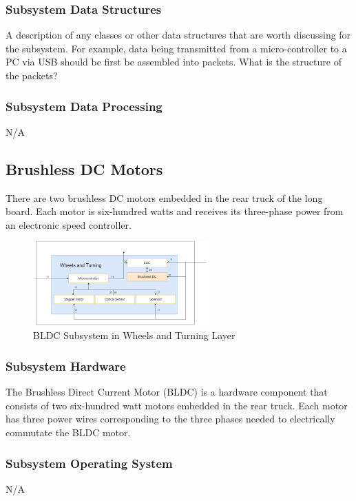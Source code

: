 \subsubsection{Subsystem Data Structures}
A description of any classes or other data structures that are worth discussing for the subsystem. For example, data being transmitted from a micro-controller to a PC via USB should be first be assembled into packets. What is the structure of the packets?

\subsubsection{Subsystem Data Processing}
N/A

\subsection{Brushless DC Motors}
There are two brushless DC motors embedded in the rear truck of the long board. Each motor is six-hundred watts and receives its three-phase power from an electronic speed controller.

\begin{figure}[h!]
	\centering
 	\includegraphics[width=0.60\textwidth]{images/Keaton/BLDC.png}
 \caption{BLDC Subsystem in Wheels and Turning Layer}
\end{figure}

\subsubsection{Subsystem Hardware}
The Brushless Direct Current Motor (BLDC) is a hardware component that consists of two six-hundred watt motors embedded in the rear truck. Each motor has three power wires corresponding to the three phases needed to electrically commutate the BLDC motor.

\subsubsection{Subsystem Operating System}
N/A

